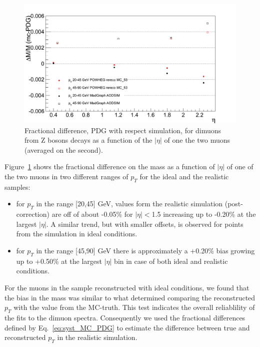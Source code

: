 \begin{figure}[hbtp]  
\begin{center}
\includegraphics[width=\textwidth]{figures/ScalePdg_mc_Eta_Z}
 \hspace{1cm} 
   \caption{Fractional difference, PDG with respect simulation,
     for dimuons from Z bosons decays as a function of the $|\eta|$
   of one the two muons (averaged on the second).} 
   \label{fig:syst_MC_PDG_eta} 
 \end{center}
\end{figure} 

Figure~\ref{fig:syst_MC_PDG_eta} shows the fractional difference on
the mass as a function of $|\eta|$ of one of the two muons in two
different ranges of $p_T$ for the ideal and the realistic samples:
\begin{itemize}
\item for $p_T$ in the range [20,45] GeV, values
form the realistic simulation (post-correction) are off of about -0.05\%
for $|\eta|<$1.5 increasing up to -0.20\% at the largest $|\eta|$.
A similar trend, but with smaller offsets, is observed for points from the simulation in ideal
conditions. 
\item for $p_T$ in the range [45,90] GeV there is approximately
a +0.20\% bias growing up to +0.50\% at the largest $|\eta|$ bin
in case of both ideal and realistic conditions. 
\end{itemize}
For the muons in the sample reconstructed with ideal conditions, 
we found that the bias in the mass was similar to what determined
comparing the reconstructed $p_T$ with the value from the
MC-truth. This test indicates the overall reliablility of the fits
to the dimuon spectra. Consequently we used the fractional differences
defined by Eq.~\ref{eq:syst_MC_PDG} to estimate the difference between 
true and reconstructed $p_T$ in the realistic simulation.

